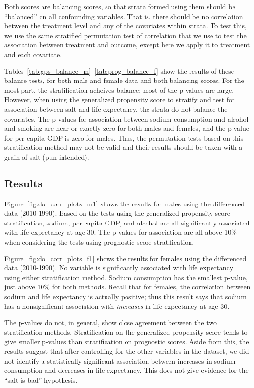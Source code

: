 \documentclass[11pt]{article}\usepackage[]{graphicx}\usepackage[]{color}
\begin{document}
Both scores are balancing scores, so that strata formed using them should be ``balanced'' on all confounding variables.
That is, there should be no correlation between the treatment level and any of the covariates within strata.
To test this, we use the same stratified permutation test of correlation that we use to test the association between treatment and outcome, except here we apply it to treatment and each covariate.

Tables~\ref{tab:gps_balance_m}--\ref{tab:prog_balance_f} show the results of these balance tests, for both male and female data and both balancing scores.
For the most part, the stratification acheives balance: most of the p-values are large.
However, when using the generalized propensity score to stratify and test for association between salt and life expectancy, the strata do not balance the covariates.
The p-values for association between sodium consumption and alcohol and smoking are near or exactly zero for both males and females, and the p-value for per capita GDP is zero for males.
Thus, the permutation tests based on this stratification method may not be valid and their results should be taken with a grain of salt (pun intended).

\subsection{Results}
Figure~\ref{fig:do_corr_plots_m1} shows the results for males using the differenced data (2010-1990).
Based on the tests using the generalized propensity score stratification, sodium, per capita GDP, and alcohol are all significantly associated with life expectancy at age 30.
The p-values for association are all above 10\% when considering the tests using prognostic score stratification.

Figure~\ref{fig:do_corr_plots_f1} shows the results for females using the differenced data (2010-1990).
No variable is significantly associated with life expectancy using either stratification method.
Sodium consumption has the smallest p-value, just above 10\% for both methods.
Recall that for females, the correlation between sodium and life expectancy is actually positive; thus this result says that sodium has a nonsignificant association with \textit{increases} in life expectancy at age 30.

The p-values do not, in general, show close agreement between the two stratification methods.
Stratification on the generalized propensity score tends to give smaller p-values than stratification on prognostic scores.
Aside from this, the results suggest that after controlling for the other variables in the dataset, we did not identify a statistically significant association between increases in sodium consumption and decreases in life expectancy.
This does not give evidence for the ``salt is bad'' hypothesis.
\end{document}
